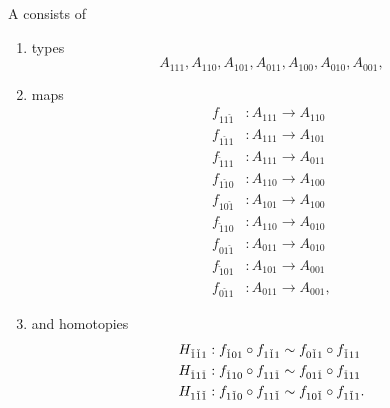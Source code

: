 \begin{defn}
A  consists of 
\begin{enumerate}
\item types
\begin{equation*}
A_{111},A_{110},A_{101},A_{011},A_{100},A_{010},A_{001},
\end{equation*}
\item maps
\begin{align*}
f_{11\check{1}} & : A_{111} \to A_{110}\\
f_{1\check{1}1} & : A_{111} \to A_{101}\\
f_{\check{1}11} & : A_{111} \to A_{011}\\
f_{1\check{1}0} & : A_{110} \to A_{100}\\
f_{10\check{1}} & : A_{101} \to A_{100}\\
f_{\check{1}10} & : A_{110} \to A_{010}\\
f_{01\check{1}} & : A_{011} \to A_{010}\\
f_{\check{1}01} & : A_{101} \to A_{001}\\
f_{0\check{1}1} & : A_{011} \to A_{001},
\end{align*}
\item and homotopies
\begin{align*}
H_{\check{1}\check{1}1} & : f_{\check{1}01}\circ f_{1\check{1}1} \sim f_{0\check{1}1}\circ f_{\check{1}11} \\
H_{\check{1}1\check{1}} & : f_{\check{1}10}\circ f_{11\check{1}} \sim f_{01\check{1}}\circ f_{\check{1}11} \\
H_{1\check{1}\check{1}} & : f_{1\check{1}0}\circ f_{11\check{1}} \sim f_{10\check{1}}\circ f_{1\check{1}1}.
\end{align*}
\end{enumerate}
\end{defn}

